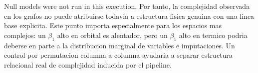 Null models were not run in this execution. Por tanto, la complejidad observada en los grafos no puede atribuirse todavia a estructura fisica genuina con una linea base explicita. Este punto importa especialmente para los espacios mas complejos: un $\beta_1$ alto en orbital es alentador, pero un $\beta_1$ alto en termico podria deberse en parte a la distribucion marginal de variables e imputaciones. Un control por permutacion columna a columna ayudaria a separar estructura relacional real de complejidad inducida por el pipeline.
